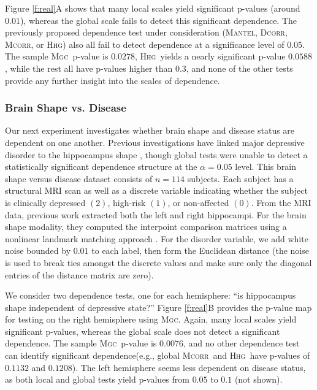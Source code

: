 \documentclass[11pt]{article}
\providecommand{\sct}[1]{{\normalfont\textsc{#1}}}
\newcommand{\Mgc}{\sct{Mgc}}
\newcommand{\Hhg}{\sct{Hhg}}
\newcommand{\Dcorr}{\sct{Dcorr}}
\newcommand{\Mcorr}{\sct{Mcorr}}
\newcommand{\Mantel}{\sct{Mantel}}
\begin{document}


Figure \ref{f:real}{\color{magenta}A}  shows that many local scales yield significant p-values (around $0.01$), whereas the global scale fails to detect this significant dependence. The previously proposed dependence test under consideration (\Mantel, \Dcorr, \Mcorr, or \Hhg) also all fail to detect dependence at a significance level of $0.05$. The sample \Mgc~p-value is $0.0278$, \Hhg~yields a nearly significant p-value $0.0588$, while the rest all have p-values higher than $0.3$, and none of the other tests provide any further insight into the scales of dependence.


\subsubsection*{Brain Shape vs. Disease} %


Our next experiment investigates whether brain shape and disease status are dependent on one another.  Previous investigations have linked major depressive disorder to the hippocampus shape \cite{ParkEtAl2008,PosenerEtAl2003}, though global tests were unable to detect a statistically significant dependence structure at the $\alpha=0.05$ level.
%
This brain shape versus disease dataset consists of $n=114$ subjects. Each subject has a structural MRI scan as well as a discrete variable indicating whether the subject is clinically depressed $(2)$, high-risk $(1)$, or non-affected $(0)$.  From the MRI data, previous work  extracted both the left and right hippocampi.   For the brain shape modality, they computed the interpoint comparison matrices using a nonlinear landmark matching approach \cite{ParkEtAl2008,BegEtAl2005}. For the  disorder variable, we add white noise bounded by $0.01$ to each label, then form the Euclidean distance (the noise is used to break ties amongst the discrete values and make sure only the diagonal entries of the distance matrix are zero).

We consider two dependence tests, one for each hemisphere: ``is hippocampus shape independent of depressive state?''
Figure \ref{f:real}{\color{magenta}B} provides the p-value map for testing on the right hemisphere using \Mgc. Again, many local scales yield significant p-values, whereas the global scale does not detect a significant dependence. The sample \Mgc~p-value is $0.0076$, and no other dependence test can identify significant dependence(e.g., global \Mcorr~and \Hhg~have p-values of $0.1132$ and $0.1208$). The left hemisphere seems less dependent on disease status, as both local and global tests yield p-values from $0.05$ to $0.1$ (not shown). 
\end{document}
